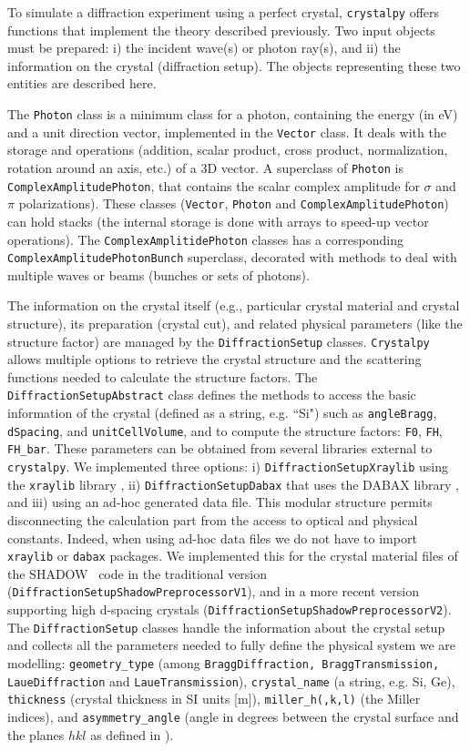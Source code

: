 \documentclass[preprint]{iucr}              %
\begin{document}
To simulate a diffraction experiment using a perfect crystal, {\tt crystalpy}  offers functions that implement the theory described previously. Two input objects must be prepared: i) the incident wave(s) or  photon ray(s), and ii) the information on the crystal (diffraction setup). The objects representing these two entities are described here. 

The {\tt Photon} class is a minimum class for a photon, containing the energy (in eV) and a unit direction vector, implemented in 
the {\tt Vector} class. It deals with the storage and operations (addition, scalar product, cross product, normalization, rotation around an axis, etc.) of a 3D vector. A superclass of {\tt Photon} is {\tt ComplexAmplitudePhoton}, that contains the scalar complex amplitude for $\sigma$ and $\pi$ polarizations). 
These classes ({\tt Vector}, {\tt Photon} and {\tt ComplexAmplitudePhoton}) can hold stacks (the internal storage is done with arrays to speed-up vector operations). The {\tt ComplexAmplitidePhoton} classes 
has a corresponding {\tt ComplexAmplitudePhotonBunch} superclass, decorated with methods to deal with multiple waves or beams (bunches or sets of photons). 

The information on the crystal itself (e.g., particular crystal material and crystal structure), its preparation (crystal cut), and related physical parameters (like the structure factor) are managed by the {\tt DiffractionSetup} classes. {\tt Crystalpy} allows multiple options to retrieve the crystal structure and the scattering functions needed to calculate the structure factors. 
The {\tt DiffractionSetupAbstract} class defines the methods to access the basic information of the crystal (defined as a string, e.g. ``Si") such as {\tt angleBragg}, {\tt dSpacing}, and {\tt unitCellVolume}, and to compute the structure factors: {\tt F0}, {\tt FH}, {\tt FH\_bar}. These parameters can be obtained from several libraries external to {\tt crystalpy}. We implemented three options: i) {\tt DiffractionSetupXraylib} using the {\tt xraylib} library \cite{xraylib}, ii) {\tt DiffractionSetupDabax} that uses the DABAX library \cite{dabax}, and iii) using an ad-hoc generated data file. This modular structure permits disconnecting the calculation part from the access to optical and physical constants. Indeed, when using ad-hoc data files we do not have to import {\tt xraylib} or {\tt dabax} packages. We implemented this for the crystal material files of the SHADOW~\cite{codeSHADOW} code in the traditional version ({\tt DiffractionSetupShadowPreprocessorV1}), and in a more recent version \cite{Yu2022} supporting high d-spacing crystals ({\tt DiffractionSetupShadowPreprocessorV2}).
The {\tt DiffractionSetup} classes handle the information about the crystal setup and collects all the parameters needed to fully define the physical system we are modelling:
{\tt geometry\_type} (among {\tt BraggDiffraction, BraggTransmission, LaueDiffraction} and {\tt LaueTransmission}),
{\tt crystal\_name} (a string, e.g. Si, Ge),
{\tt thickness} (crystal thickness in SI units [m]),
{\tt miller\_h(,k,l)} (the Miller indices),
and {\tt asymmetry\_angle} (angle in degrees between the crystal surface and the planes $hkl$ as defined in \cite{codeCRYSTAL}).
\end{document}
